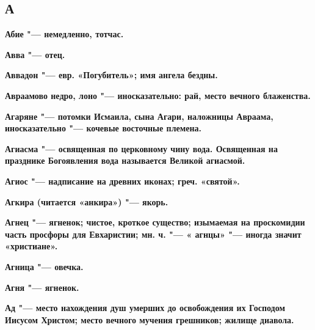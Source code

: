 

 
\begin{multicols}{2}\footnotesize

\section*{А}


\bfseries Абие\normalfont{} "--- немедленно, тотчас. 




\bfseries Авва\normalfont{} "--- отец. 




\bfseries Аввадон\normalfont{} "--- евр. «Погубитель»; имя ангела бездны. 




\bfseries Авраамово недро, лоно\normalfont{} "--- иносказательно: рай, место вечного блаженства. 




\bfseries Агаряне\normalfont{} "--- потомки Исмаила, сына Агари, наложницы Авраама, иносказательно "--- кочевые восточные племена. 




\bfseries Агиасма\normalfont{} "--- освященная по церковному чину вода. Освященная на празднике Богоявления вода называется Великой агиасмой. 




\bfseries Агиос\normalfont{} "--- надписание на древних иконах; греч. «святой». 




\bfseries Агкира\normalfont{} (читается «анкира») "--- якорь. 




\bfseries Агнец\normalfont{} "--- ягненок; чистое, кроткое существо; изымаемая на проскомидии часть просфоры для Евхаристии; мн. ч. "--- « \bfseries агнцы\normalfont{}» "--- иногда значит «христиане». 




\bfseries Агница\normalfont{} "--- овечка. 




\bfseries Агня\normalfont{} "--- ягненок. 




\bfseries Ад\normalfont{} "--- место нахождения душ умерших до освобождения их Господом Иисусом Христом; место вечного мучения грешников; жилище диавола. 





\end{multicols}
